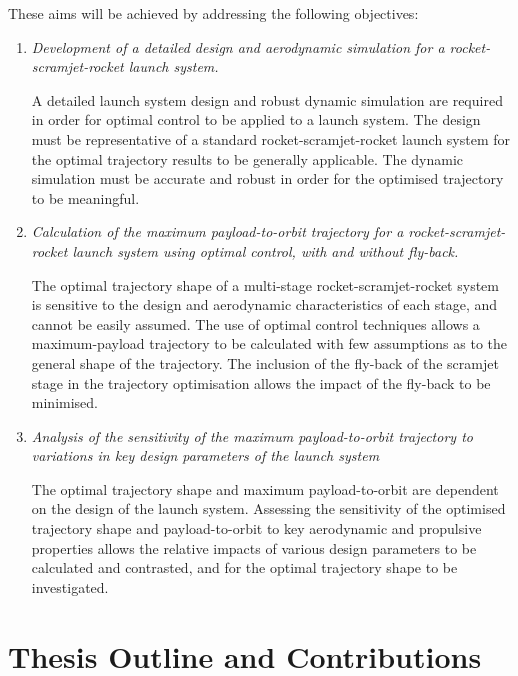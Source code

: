     
\vspace*{10pt}
    \noindent These aims will be achieved by addressing the following objectives:
    \begin{enumerate}
    	 \item \emph{Development of a detailed design and aerodynamic simulation for a rocket-scramjet-rocket launch system.}
    	 
    	   A detailed launch system design and robust dynamic simulation are required in order for optimal control to be applied to a launch system. The design must be representative of a standard rocket-scramjet-rocket launch system for the optimal trajectory results to be generally applicable. The dynamic simulation must be accurate and robust in order for the optimised trajectory to be meaningful. \\

\item \emph{Calculation of the maximum payload-to-orbit trajectory for a rocket-scramjet-rocket launch system using optimal control, with and without fly-back.}

The optimal trajectory shape of a multi-stage rocket-scramjet-rocket system is sensitive to the design and aerodynamic characteristics of each stage, and cannot be easily assumed. The use of optimal control techniques allows a maximum-payload trajectory to be calculated with few assumptions as to the general shape of the trajectory. The inclusion of the fly-back of the scramjet stage in the trajectory optimisation allows the impact of the fly-back to be minimised.\\

      \item \emph{Analysis of the sensitivity of the maximum payload-to-orbit trajectory to variations in key design parameters of the launch system} 

	The optimal trajectory shape and maximum payload-to-orbit are dependent on the design of the launch system. 
	Assessing the sensitivity of the optimised trajectory shape and payload-to-orbit to key aerodynamic and propulsive properties allows the relative impacts of various design parameters to be calculated and contrasted, and for the optimal trajectory shape to be investigated. \\

    

    \end{enumerate}

  \clearpage
  \section{Thesis Outline and Contributions}

